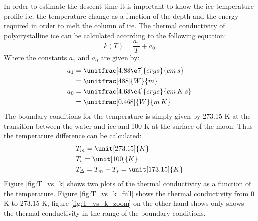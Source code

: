 
%

In order to estimate the descent time it is important to know the ice temperature profile i.e. the temperature change as a function of the depth and the energy required in order to melt the column of ice. The thermal conductivity of polycrystalline ice can be calculated according to the following equation\cite[(2.3)]{article:thermalConductivity}:
\begin{equation}
	k(T) = \frac{a_1}{T} + a_0
\end{equation}
Where the constants $a_1$ and $a_0$ are given by:
\begin{align}
	a_1 &= \unitfrac[4.88 \e7]{ergs}{cm \, s} \\ \nonumber
		&= \unitfrac[488]{W}{m} \\
	a_0 &= \unitfrac[4.68 \e4]{ergs}{cm \, K \, s} \\ \nonumber
		&= \unitfrac[0.468]{W}{m \, K}
\end{align}
The boundary conditions for the temperature is simply given by 273.15 K at the transition between the water and ice and 100 K at the surface of the moon\cite{article:thermalConductivity}. Thus the temperature difference can be calculated:
\begin{align}
	& T_m = \unit[273.15]{K} \\
	& T_s = \unit[100]{K} \\
	& T_\Delta = T_m - T_s = \unit[173.15]{K}
\end{align}
Figure \ref{fig:T_vs_k} shows two plots of the thermal conductivity as a function of the temperature. Figure \ref{fig:T_vs_k_full} shows the thermal conductivity from 0 K to 273.15 K, figure \ref{fig:T_vs_k_zoom} on the other hand shows only shows the thermal conductivity in the range of the boundary conditions.
